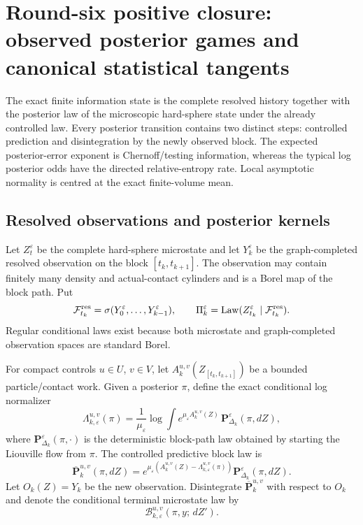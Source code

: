 \section{Round-six positive closure: observed posterior games and canonical statistical tangents}
\label{sec:r6-c1}

The exact finite information state is the complete resolved history together
with the posterior law of the microscopic hard-sphere state under the already
controlled law.  Every posterior transition contains two distinct steps:
controlled prediction and disintegration by the newly observed block.  The
expected posterior-error exponent is Chernoff/testing information, whereas the
typical log posterior odds have the directed relative-entropy rate.  Local
asymptotic normality is centred at the exact finite-volume mean.

\subsection{Resolved observations and posterior kernels}

Let \(Z_t^\varepsilon\) be the complete hard-sphere microstate and let
\(Y_k^\varepsilon\) be the graph-completed resolved observation on the block
\([t_k,t_{k+1}]\).  The observation may contain finitely many density and
actual-contact cylinders and is a Borel map of the block path.  Put
\[
\mathcal F_{t_k}^{\rm res}=\sigma(Y_0^\varepsilon,\ldots,Y_{k-1}^\varepsilon),
\qquad
\Pi_k^\varepsilon=
\operatorname{Law}(Z_{t_k}^\varepsilon\mid
\mathcal F_{t_k}^{\rm res}).
\]
Regular conditional laws exist because both microstate and graph-completed
observation spaces are standard Borel.

For compact controls \(u\in U\), \(v\in V\), let
\(A_k^{u,v}(Z_{[t_k,t_{k+1}]})\) be a bounded particle/contact work.  Given a
posterior \(\pi\), define the exact conditional log normalizer
\[
\Lambda_{k,\varepsilon}^{u,v}(\pi)=
\frac1{\mu_\varepsilon}\log
\int e^{\mu_\varepsilon A_k^{u,v}(Z)}\,
\mathbf P_{\Delta_k}^\varepsilon(\pi,dZ),
\]
where \(\mathbf P_{\Delta_k}^\varepsilon(\pi,\cdot)\) is the deterministic
block-path law obtained by starting the Liouville flow from \(\pi\).
The controlled predictive block law is
\[
\overline{\mathbf P}_{k}^{u,v}(\pi,dZ)=
 e^{\mu_\varepsilon(A_k^{u,v}(Z)-
 \Lambda_{k,\varepsilon}^{u,v}(\pi))}
\mathbf P_{\Delta_k}^\varepsilon(\pi,dZ).
\]
Let \(O_k(Z)=Y_k\) be the new observation.  Disintegrate
\(\overline{\mathbf P}_{k}^{u,v}\) with respect to \(O_k\) and denote the
conditional terminal microstate law by
\[
\mathcal B_{k,\varepsilon}^{u,v}(\pi,y;\,dZ').
\]

